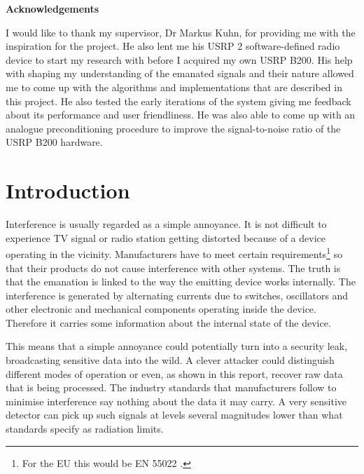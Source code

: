\documentclass[a4paper,12pt,twoside,openright]{report}
\begin{document}
\pagestyle{empty}
\singlespacing

\onehalfspacing

\singlespacing


\newpage
{\Huge \bf Acknowledgements}
\vspace{24pt} 


I would like to thank my supervisor, Dr Markus Kuhn, for providing me with the inspiration for the project. He also lent me his USRP 2 software-defined radio device to start my research with before I acquired my own USRP B200. His help with shaping my understanding of the emanated signals and their nature allowed me to come up with the algorithms and implementations that are described in this project. He also tested the early iterations of the system giving me feedback about its performance and user friendliness. He was also able to come up with an analogue preconditioning procedure to improve the signal-to-noise ratio of the USRP B200 hardware.


\newpage
\vspace*{\fill}

\setcounter{page}{0}
\pagestyle{plain}
\tableofcontents

\onehalfspacing


\chapter{Introduction}
\setcounter{page}{1} 

Interference is usually regarded as a simple annoyance. It is not difficult to experience TV signal or radio station getting distorted because of a device operating in the vicinity. Manufacturers have to meet certain requirements\footnote{For the EU this would be EN 55022 \cite{en55022}.} so that their products do not cause interference with other systems. The truth is that the emanation is linked to the way the emitting device works internally. The interference is generated by alternating currents due to switches, oscillators and other electronic and mechanical components operating inside the device. Therefore it carries some information about the internal state of the device.

This means that a simple annoyance could potentially turn into a security leak, broadcasting sensitive data into the wild. A clever attacker could distinguish different modes of operation or even, as shown in this report, recover raw data that is being processed. The industry standards that manufacturers follow to minimise interference say nothing about the data it may carry. A very sensitive detector can pick up such signals at levels several magnitudes lower than what standards specify as radiation limits.
\end{document}
